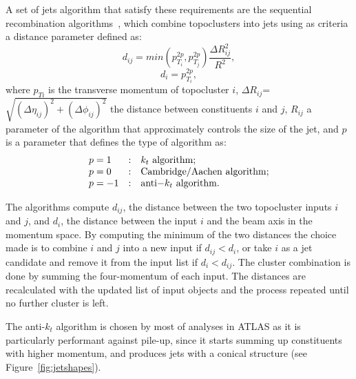 A set of jets algorithm that satisfy these requirements are the sequential recombination
algorithms~\cite{ref:Cacciari2008,ref:Cacciari2006,ref:fastjet}, which combine topoclusters
into jets using as criteria a distance parameter defined as:
\begin{equation}
d_{ij}=min(p_{T_i}^{2p},p_{T_j}^{2p})\frac{\Delta R_{ij}^{2}}{R^{2}},
\end{equation}
\begin{equation}
d_{i}=p_{T_i}^{2p},
\end{equation}
where $p_{Ti}$ is the transverse momentum of topocluster $i$, 
$\Delta R_{ij}$=$\sqrt{(\Delta\eta_{ij})^{2}+(\Delta\phi_{ij})^{2}}$ the distance 
between constituents $i$ and
$j$, $R_{ij}$ a parameter of the algorithm that approximately controls the size
of the jet, and $p$ is a  parameter that defines the type of algorithm as:
\begin{equation}\label{eq:jetalgp}
\begin{array}{lcl}
p = 1 &:& k_t {\rm\ algorithm};\\
p = 0 &:& {\rm Cambridge/Aachen\ algorithm};\\
p = -1 &:& {\rm anti-}k_t {\rm\ algorithm}.
\end{array}
\end{equation}

The algorithms compute $d_{ij}$, the distance between the two topocluster
inputs $i$ and $j$, and $d_{i}$,  the distance between the input $i$
and the beam axis in the momentum space.
By computing the minimum of the two distances the choice made is
to combine $i$ and $j$ into a new input if $d_{ij}<d_{i}$, or take
$i$ as a jet candidate and remove it from the input list if $d_{i}<d_{ij}$. 
The cluster combination is done by summing the four-momentum of each input.
The distances are recalculated with the updated list of input
objects and the process repeated until no further cluster is left.

The anti-$k_t$ algorithm is chosen by most of analyses in ATLAS as it is particularly 
performant against pile-up, since it starts summing up 
constituents with higher momentum, and produces jets with a conical
structure (see Figure~\ref{fig:jetshapes}).


